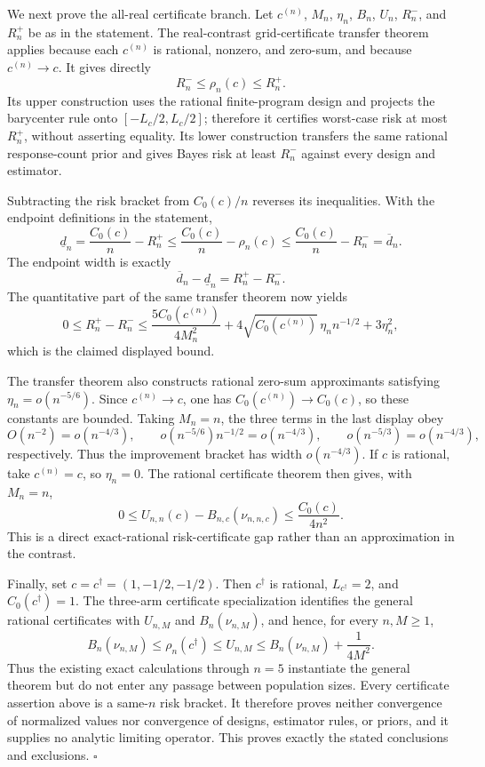 We next prove the all-real certificate branch.  Let \(c^{(n)}\), \(M_n\), \(\eta_n\), \(B_n\), \(U_n\), \(R_n^-\), and \(R_n^+\) be as in the statement.  The real-contrast grid-certificate transfer theorem applies because each \(c^{(n)}\) is rational, nonzero, and zero-sum, and because \(c^{(n)}\to c\).  It gives directly
\[
 R_n^-\leq\rho_n(c)\leq R_n^+.
\]
Its upper construction uses the rational finite-program design and projects the barycenter rule onto \([-L_c/2,L_c/2]\); therefore it certifies worst-case risk at most \(R_n^+\), without asserting equality.  Its lower construction transfers the same rational response-count prior and gives Bayes risk at least \(R_n^-\) against every design and estimator.

Subtracting the risk bracket from \(C_0(c)/n\) reverses its inequalities.  With the endpoint definitions in the statement,
\[
 \underline d_n=\frac{C_0(c)}n-R_n^+
 \leq\frac{C_0(c)}n-\rho_n(c)
 \leq\frac{C_0(c)}n-R_n^-=\overline d_n.
\]
The endpoint width is exactly
\[
 \overline d_n-\underline d_n=R_n^+-R_n^-.
\]
The quantitative part of the same transfer theorem now yields
\[
 0\leq R_n^+-R_n^-
 \leq\frac{5C_0(c^{(n)})}{4M_n^2}
 +4\sqrt{C_0(c^{(n)})}\,\eta_n n^{-1/2}
 +3\eta_n^2,
\]
which is the claimed displayed bound.

The transfer theorem also constructs rational zero-sum approximants satisfying \(\eta_n=o(n^{-5/6})\).  Since \(c^{(n)}\to c\), one has \(C_0(c^{(n)})\to C_0(c)\), so these constants are bounded.  Taking \(M_n=n\), the three terms in the last display obey
\[
 O(n^{-2})=o(n^{-4/3}),
 \qquad
 o(n^{-5/6})n^{-1/2}=o(n^{-4/3}),
 \qquad
 o(n^{-5/3})=o(n^{-4/3}),
\]
respectively.  Thus the improvement bracket has width \(o(n^{-4/3})\).  If \(c\) is rational, take \(c^{(n)}=c\), so \(\eta_n=0\).  The rational certificate theorem then gives, with \(M_n=n\),
\[
 0\leq U_{n,n}(c)-B_{n,c}(\nu_{n,n,c})
 \leq\frac{C_0(c)}{4n^2}.
\]
This is a direct exact-rational risk-certificate gap rather than an approximation in the contrast.

Finally, set \(c=c^\dagger=(1,-1/2,-1/2)\).  Then \(c^\dagger\) is rational, \(L_{c^\dagger}=2\), and \(C_0(c^\dagger)=1\).  The three-arm certificate specialization identifies the general rational certificates with \(U_{n,M}\) and \(B_n(\nu_{n,M})\), and hence, for every \(n,M\geq1\),
\[
 B_n(\nu_{n,M})\leq\rho_n(c^\dagger)\leq U_{n,M}
 \leq B_n(\nu_{n,M})+\frac1{4M^2}.
\]
Thus the existing exact calculations through \(n=5\) instantiate the general theorem but do not enter any passage between population sizes.  Every certificate assertion above is a same-\(n\) risk bracket.  It therefore proves neither convergence of normalized values nor convergence of designs, estimator rules, or priors, and it supplies no analytic limiting operator.  This proves exactly the stated conclusions and exclusions. \(\square\)